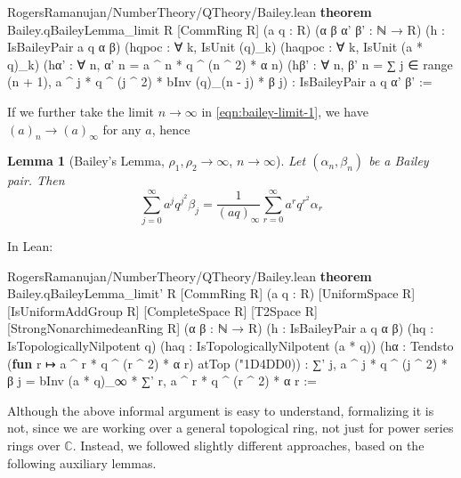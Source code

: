 \documentclass[12pt]{amsart}
\newtheorem{lemma}[theorem]{Lemma}
\theoremstyle{definition}
\theoremstyle{remark}
\numberwithin{equation}{subsection}
\newcommand{\nhds}{{\char"1D4DD}}
\newcommand{\kw}[1]{\textcolor{keywordcolor}{\textbf{#1}}}
\newcommand{\var}[1]{\textcolor{tacticcolor}{#1}}
\newcommand{\num}[1]{\textcolor{numcolor}{#1}}
\newcommand{\imp}[1]{\textcolor{commentcolor}{\textbraceleft#1\textbraceright}}
\begin{document}
\begin{code}{RogersRamanujan/NumberTheory/QTheory/Bailey.lean}
\kw{theorem} Bailey.qBaileyLemma_limit \imp{R} [CommRing \var{R}] (\var{a} \var{q} : \var{R}) (\var{α} \var{β} \var{α'} \var{β'} : ℕ → \var{R})
  (\var{h} : IsBaileyPair \var{a} \var{q} \var{α} \var{β})
  (\var{hqpoc} : ∀ \var{k}, IsUnit (\var{q})_\var{k}) (\var{haqpoc} : ∀ \var{k}, IsUnit (\var{a} * \var{q})_\var{k})
  (\var{hα'} : ∀ \var{n}, \var{α'} \var{n} = \var{a} ^ \var{n} * \var{q} ^ (\var{n} ^ \num{2}) * \var{α} \var{n})
  (\var{hβ'} : ∀ \var{n}, \var{β'} \var{n} = ∑ \var{j} ∈ range (\var{n} + \num{1}), \var{a} ^ \var{j} * \var{q} ^ (\var{j} ^ \num{2}) * bInv (\var{q})_(\var{n} - \var{j}) * \var{β} \var{j}) :
  IsBaileyPair \var{a} \var{q} \var{α'} \var{β'} :=
\end{code}
If we further take the limit $n \to \infty$ in \eqref{eqn:bailey-limit-1}, we have $(a)_n \to (a)_\infty$ for any $a$, hence
\begin{lemma}[Bailey's Lemma, $\rho_1, \rho_2 \to \infty$, $n \to \infty$]
    \label{lem:bailey-limit-2}
    Let $(\alpha_n, \beta_n)$ be a Bailey pair. Then
    \begin{equation}
        \sum_{j=0}^{\infty} a^j q^{j^2} \beta_j = \frac{1}{(aq)_\infty} \sum_{r=0}^{\infty} a^r q^{r^2} \alpha_r
    \end{equation}
\end{lemma}

In Lean:

\begin{code}{RogersRamanujan/NumberTheory/QTheory/Bailey.lean}
\kw{theorem} Bailey.qBaileyLemma_limit' \imp{R} [CommRing \var{R}] (\var{a} \var{q} : \var{R}) [UniformSpace \var{R}]
  [IsUniformAddGroup \var{R}] [CompleteSpace \var{R}] [T2Space \var{R}] [StrongNonarchimedeanRing \var{R}]
  (\var{α} \var{β} : ℕ → \var{R}) (\var{h} : IsBaileyPair \var{a} \var{q} \var{α} \var{β})
  (\var{hq} : IsTopologicallyNilpotent \var{q}) (\var{haq} : IsTopologicallyNilpotent (\var{a} * \var{q}))
  (\var{hα} : Tendsto (\kw{fun} \var{r} ↦ \var{a} ^ \var{r} * \var{q} ^ (\var{r} ^ \num{2}) * \var{α} \var{r}) atTop (\nhds \num{0})) :
  ∑' \var{j}, \var{a} ^ \var{j} * \var{q} ^ (\var{j} ^ \num{2}) * \var{β} \var{j} = bInv (\var{a} * \var{q})_∞ * ∑' \var{r}, \var{a} ^ \var{r} * \var{q} ^ (\var{r} ^ \num{2}) * \var{α} \var{r} :=
\end{code}

Although the above informal argument is easy to understand, formalizing it is not, since we are working over a general topological ring, not just for power series rings over $\mathbb{C}$.
Instead, we followed slightly different approaches, based on the following auxiliary lemmas. 
\end{document}
